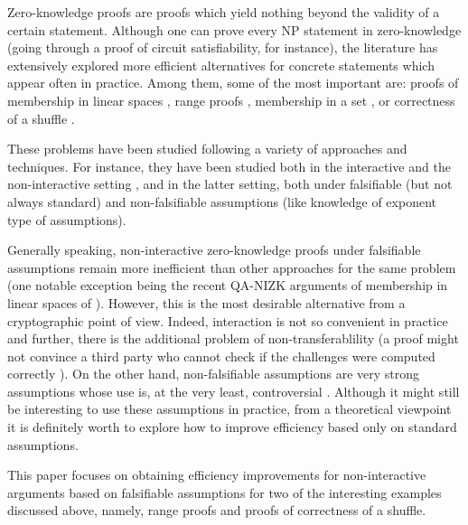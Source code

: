 Zero-knowledge proofs are proofs which yield nothing beyond the validity of a certain statement. Although one can prove every NP statement in zero-knowledge (going through a proof of circuit satisfiability, for instance),  the literature has extensively explored 
more efficient alternatives for concrete statements which appear often in practice. Among them, some of the most important are: proofs of membership in linear spaces \cite{AC:JutRoy13,EC:LPJY14,C:JutRoy14,EC:AbdBenPoi15,EC:KilWee15}, range proofs \cite{AC:CamChaShe08,PAIRING:RiaKohPre09,FC:ChaLipZha12}, membership in a set \cite{PAIRING:RiaKohPre09,EC:BayGro13}, or correctness of a shuffle \cite{Chaum81,AC:GroLu07,SCN:LipZha12,EPRINT:FauLip15}. 

These problems have been studied following a variety of approaches and techniques. For instance, they have been studied both in the interactive \cite{EC:BayGro12,AC:CamChaShe08,AC:Groth11} and the non-interactive setting \cite{PAIRING:RiaKohPre09,FC:ChaLipZha12,AC:GroLu07,SCN:LipZha12,EPRINT:FauLip15}, and in the latter setting, both under falsifiable (but not always standard) \cite{PAIRING:RiaKohPre09,AC:GroLu07} and non-falsifiable assumptions \cite{FC:ChaLipZha12,SCN:LipZha12,EPRINT:FauLip15} (like knowledge of exponent type of assumptions). 

Generally speaking, non-interactive zero-knowledge proofs under falsifiable assumptions remain more inefficient than other approaches for the same problem (one notable exception being the recent QA-NIZK arguments of membership in linear spaces of  \cite{EC:LPJY14,C:JutRoy14,EC:KilWee15}). However, this is the most desirable alternative from a cryptographic point of view. Indeed, interaction is not  so convenient in practice and further, there is the additional problem of non-transferablility (a proof might not convince a third party who cannot check if the challenges were computed correctly \cite{C:Pass03}).  On the other hand, non-falsifiable assumptions are very strong assumptions whose use is, at the very least, controversial \cite{EPRINT:BCPR13a,AC:BoyPas15}. Although it might still be interesting to use these assumptions in practice, from a theoretical viewpoint it is definitely worth to explore how to improve efficiency based only on standard assumptions.  

This paper focuses on obtaining efficiency improvements for non-interactive arguments based on falsifiable assumptions for two of the interesting examples discussed above, namely, range proofs and proofs of correctness of a shuffle.  

